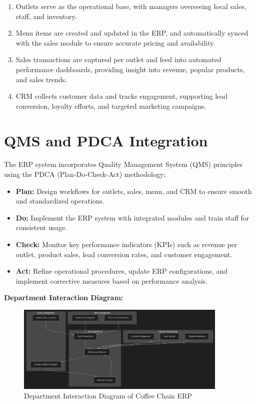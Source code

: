 \begin{enumerate}
    \item Outlets serve as the operational base, with managers overseeing local sales, staff, and inventory.
    \item Menu items are created and updated in the ERP, and automatically synced with the sales module to ensure accurate pricing and availability.
    \item Sales transactions are captured per outlet and feed into automated performance dashboards, providing insight into revenue, popular products, and sales trends.
    \item CRM collects customer data and tracks engagement, supporting lead conversion, loyalty efforts, and targeted marketing campaigns.
\end{enumerate}

\section*{QMS and PDCA Integration}

The ERP system incorporates Quality Management System (QMS) principles using the PDCA (Plan-Do-Check-Act) methodology:

\begin{itemize}
    \item \textbf{Plan:} Design workflows for outlets, sales, menu, and CRM to ensure smooth and standardized operations.
    \item \textbf{Do:} Implement the ERP system with integrated modules and train staff for consistent usage.
    \item \textbf{Check:} Monitor key performance indicators (KPIs) such as revenue per outlet, product sales, lead conversion rates, and customer engagement.
    \item \textbf{Act:} Refine operational procedures, update ERP configurations, and implement corrective measures based on performance analysis.
\end{itemize}


\textbf{Department Interaction Diagram:}  


\begin{figure}[H]
\centering
\includegraphics[width=0.9\textwidth,height=0.5\textheight,keepaspectratio]{diagrams/department.png}
\caption{Department Interaction Diagram of Coffee Chain ERP}
\end{figure}


